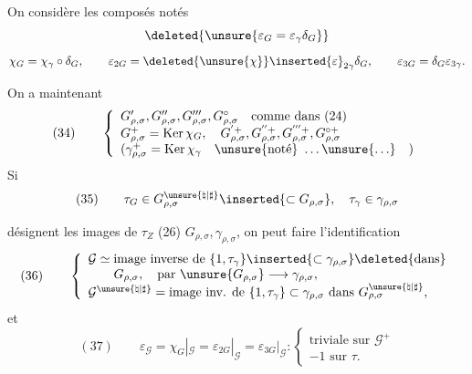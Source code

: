 On considère les composés
notés
\[
\deleted{\unsure{\varepsilon_G=\varepsilon_\gamma\delta_G}}
\]
\[
\chi_G=\chi_\gamma\circ\delta_G,\qquad
\varepsilon_{2G}=\deleted{\unsure{\chi}}\inserted{\varepsilon}_{2\gamma}\delta_G,\qquad
\varepsilon_{3G}=\delta_G\varepsilon_{3\gamma}.
\]

On a maintenant
\[
(34)\qquad
\left\{
\begin{array}{l}
G'_{\rho,\sigma},G''_{\rho,\sigma},G'''_{\rho,\sigma},G^\circ_{\rho,\sigma}
\quad\text{comme dans }(24)\\
G^+_{\rho,\sigma}=\operatorname{Ker}\chi_G,\quad
G^{'+}_{\rho,\sigma},G^{''+}_{\rho,\sigma},G^{'''+}_{\rho,\sigma},G^{\circ+}_{\rho,\sigma}\\
(\gamma^+_{\rho,\sigma}=\operatorname{Ker}\chi_\gamma\quad
\text{\unsure{noté}}\ \ldots\unsure{\ldots}\quad)
\end{array}
\right.
\]
Si
\[
(35)\qquad
\tau_G\in G_{\rho,\sigma}^{\unsure{\natural|\sharp}}
\inserted{\subset G_{\rho,\sigma}},\quad
\tau_\gamma\in\gamma_{\rho,\sigma}
\]

désignent les images de $\tau_Z$ (26) 
$G_{\rho,\sigma},\gamma_{\rho,\sigma}$,
on peut faire l'identification
\[
(36)\qquad
\left\{
\begin{array}{l}
\mathcal G\simeq\text{image inverse de }\{1,\tau_\gamma\}
\inserted{\subset\gamma_{\rho,\sigma}}\deleted{\text{dans}}\\
\qquad G_{\rho,\sigma},\quad\text{par }\unsure{G_{\rho,\sigma}}
\longrightarrow\gamma_{\rho,\sigma},\\
\mathcal G^{\unsure{\natural|\sharp}}
=\text{image inv. de }\{1,\tau_\gamma\}\subset\gamma_{\rho,\sigma}
\text{ dans }G_{\rho,\sigma}^{\unsure{\natural|\sharp}},
\end{array}
\right.
\]
et
\[
(37)\qquad
\varepsilon_{\mathcal G}
=\chi_G|_{\mathcal G}
=\varepsilon_{2G}|_{\mathcal G}
=\varepsilon_{3G}|_{\mathcal G}
:\left\{
\begin{array}{l}
\text{triviale sur }\mathcal G^+\\
-1\text{ sur }\tau.
\end{array}
\right.
\]

